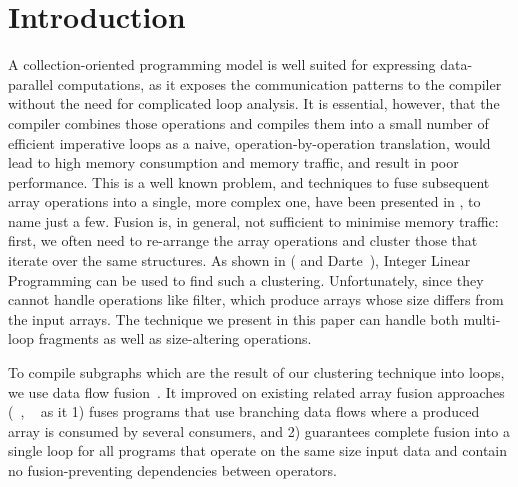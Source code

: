 \section{Introduction}
\label{s:Introduction}
A collection-oriented programming model is well suited for expressing data-parallel computations, as it exposes the communication patterns to the compiler without the need for complicated loop analysis.  It is essential, however, that the compiler combines those operations and compiles them into a small number of efficient imperative loops as a naive, operation-by-operation translation, would lead to high memory consumption and memory traffic, and result in poor performance. This is a well known problem, and techniques to fuse subsequent array operations into a single, more complex one, have been presented in \cite{coutts2007streamfusion, gao1993collective, kennedy1993typedfusion, kennedy2001fastgreedy, keller2010repa}, to name just a few. Fusion is, in general, not sufficient to minimise memory traffic: first, we often need to re-arrange the array operations and cluster those that iterate over the same structures. As shown in  (\cite{megiddo1998optimal} and Darte~\cite{darte2002contraction}), Integer Linear Programming can be used to find such a clustering. Unfortunately, since they cannot handle operations like filter, which produce arrays whose size differs from the input arrays.  The technique we present in this paper can handle both multi-loop fragments as well as size-altering operations. 

To compile subgraphs which are the result of our clustering technique into loops, we use data flow fusion~\cite{lippmeier2013flow}. It improved on existing related array fusion approaches (~\cite{coutts2007streamfusion}, ~\cite{keller2010repa} as it 1) fuses programs that use branching data flows where a produced array is consumed by several consumers, and 2) guarantees complete fusion into a single loop for all programs that operate on the same size input data and contain no fusion-preventing dependencies between operators. 


